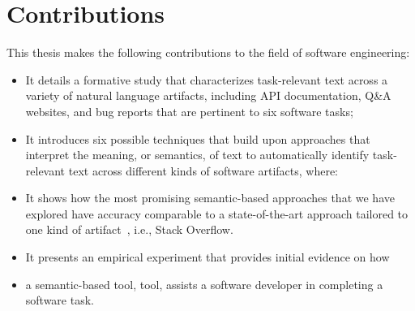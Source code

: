

\section{Contributions}
\label{cp1:contributions}

This thesis makes the following contributions to the field of software engineering:




\begin{itemize}

    \item It details a formative study that characterizes task-relevant text across a variety of natural language artifacts, including  API documentation, Q\&A websites, and
    bug reports that are pertinent to six software tasks; 

    \item It introduces six possible techniques that build upon approaches that interpret the meaning, or semantics, of text
    to automatically identify task-relevant text across different kinds of software artifacts, where:


    \item It shows how the most promising semantic-based approaches that we have explored have accuracy comparable to a state-of-the-art approach
    tailored to one kind of artifact~\cite{Xu2017}, i.e., Stack Overflow.

    \item It presents an empirical experiment that provides initial evidence on how  
    \item a semantic-based tool, \acs{tool}, assists a software developer in completing a software task. 
\end{itemize}











